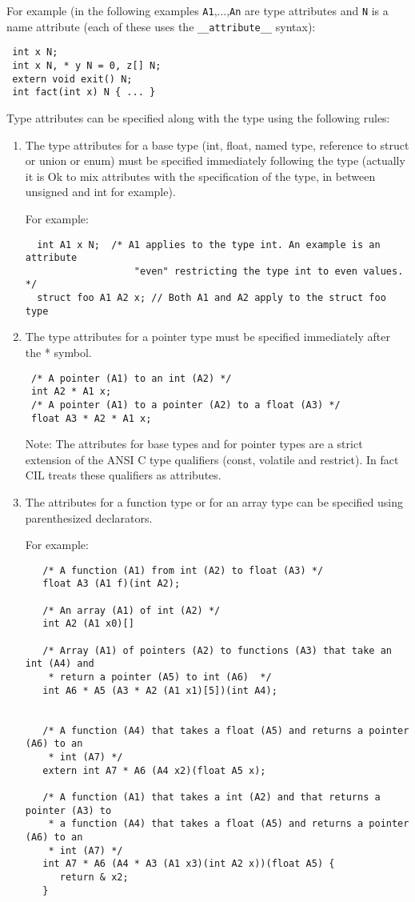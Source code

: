 \documentclass{article}
\def\t#1{{\tt #1}}
\begin{document}
 For example (in the following examples \t{A1},...,\t{An} are type attributes
and \t{N} is a name attribute (each of these uses the \t{\_\_attribute\_\_} syntax):

\begin{verbatim}
 int x N;
 int x N, * y N = 0, z[] N;
 extern void exit() N;
 int fact(int x) N { ... }
\end{verbatim}


 Type attributes can be specified along with the type using the following
 rules: 
\begin{enumerate}
 \item The type attributes for a base type (int, float, named type, reference
    to struct or union or enum) must be specified immediately following the
    type (actually it is Ok to mix attributes with the specification of the
    type, in between unsigned and int for example).

  For example:
\begin{verbatim}
  int A1 x N;  /* A1 applies to the type int. An example is an attribute
                   "even" restricting the type int to even values. */
  struct foo A1 A2 x; // Both A1 and A2 apply to the struct foo type
\end{verbatim}
 
 \item The type attributes for a pointer type must be specified immediately
 after the * symbol.
\begin{verbatim}
 /* A pointer (A1) to an int (A2) */
 int A2 * A1 x;
 /* A pointer (A1) to a pointer (A2) to a float (A3) */
 float A3 * A2 * A1 x;
\end{verbatim}


 Note: The attributes for base types and for pointer types are a strict
 extension of the ANSI C type qualifiers (const, volatile and restrict). In
 fact CIL treats these qualifiers as attributes. 

  \item The attributes for a function type or for an array type can be
     specified using parenthesized declarators.

   For example:
\begin{verbatim}
   /* A function (A1) from int (A2) to float (A3) */
   float A3 (A1 f)(int A2);

   /* An array (A1) of int (A2) */
   int A2 (A1 x0)[]

   /* Array (A1) of pointers (A2) to functions (A3) that take an int (A4) and 
    * return a pointer (A5) to int (A6)  */
   int A6 * A5 (A3 * A2 (A1 x1)[5])(int A4);


   /* A function (A4) that takes a float (A5) and returns a pointer (A6) to an 
    * int (A7) */
   extern int A7 * A6 (A4 x2)(float A5 x);

   /* A function (A1) that takes a int (A2) and that returns a pointer (A3) to 
    * a function (A4) that takes a float (A5) and returns a pointer (A6) to an 
    * int (A7) */
   int A7 * A6 (A4 * A3 (A1 x3)(int A2 x))(float A5) {
      return & x2;
   }
\end{verbatim}

\end{enumerate}
\end{document}
